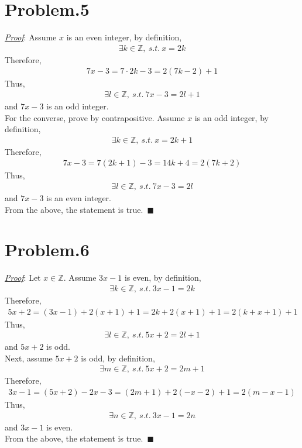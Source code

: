 \documentclass[12pt]{article}
\begin{document}
\section*{Problem.5}
\underline{\textit{Proof}}: Assume $x$ is an even integer, by definition,
\begin{gather*}
\exists k \in \mathbb{Z},~s.t.~x = 2k
\end{gather*}
Therefore,
\begin{gather*}
7x-3 = 7 \cdot 2k - 3 = 2(7k-2)+1
\end{gather*}
Thus,
\begin{gather*}
\exists l \in \mathbb{Z},~s.t.~7x-3 = 2l+1
\end{gather*}
and $7x-3$ is an odd integer.\\
For the converse, prove by contrapositive.
Assume $x$ is an odd integer, by definition,
\begin{gather*}
\exists k \in \mathbb{Z},~s.t.~x = 2k + 1
\end{gather*}
Therefore,
\begin{gather*}
7x-3 = 7(2k+1) - 3 = 14k + 4 = 2(7k+2)
\end{gather*}
Thus,
\begin{gather*}
\exists l \in \mathbb{Z},~s.t.~7x-3 = 2l
\end{gather*}
and $7x-3$ is an even integer.\\
From the above, the statement is true.~$\blacksquare$

\section*{Problem.6}
\underline{\textit{Proof}}: Let $x \in \mathbb{Z}$.
Assume $3x-1$ is even, by definition,
\begin{gather*}
\exists k \in \mathbb{Z},~s.t.~3x - 1 = 2k
\end{gather*}
Therefore,
\begin{gather*}
5x + 2 = (3x - 1) + 2(x+1) + 1 = 2k + 2(x+1) + 1 = 2(k+x+1) + 1
\end{gather*}
Thus,
\begin{gather*}
\exists l \in \mathbb{Z},~s.t.~5x+2 = 2l + 1
\end{gather*}
and $5x+2$ is odd.\\
Next, assume $5x+2$ is odd, by definition,
\begin{gather*}
\exists m \in \mathbb{Z},~s.t.~5x+2= 2m+1
\end{gather*}
Therefore,
\begin{gather*}
3x - 1 = (5x+2) -2x -3  = (2m + 1) + 2(-x-2) + 1 = 2(m-x-1) 
\end{gather*}
Thus,
\begin{gather*}
\exists n \in \mathbb{Z},~s.t.~3x-1 = 2n
\end{gather*}
and $3x-1$ is even.\\
From the above, the statement is true.~$\blacksquare$
\end{document}
